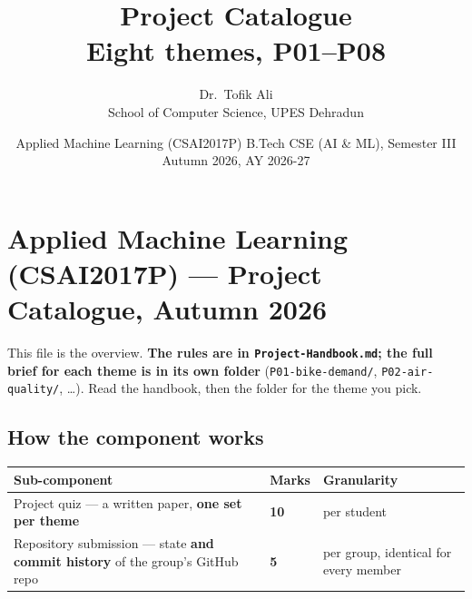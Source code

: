 \documentclass[11pt]{article}
\title{Project Catalogue\\[4pt]\large Eight themes, P01--P08}
\author{Dr.\ Tofik Ali \\ School of Computer Science, UPES Dehradun}
\date{Applied Machine Learning (CSAI2017P) \quad\textbullet\quad B.Tech CSE (AI \& ML), Semester III \\[2pt] Autumn 2026, AY 2026-27}
\begin{document}
\maketitle
\tableofcontents
\newpage

\hypertarget{applied-machine-learning-csai2017p-project-catalogue-autumn-2026}{%
\section{Applied Machine Learning (CSAI2017P) --- Project Catalogue, Autumn 2026}\label{applied-machine-learning-csai2017p-project-catalogue-autumn-2026}}

This file is the overview. \textbf{The rules are in \texttt{Project-Handbook.md}; the full brief for each theme is in its own folder} (\texttt{P01-bike-demand/}, \texttt{P02-air-quality/}, \ldots). Read the handbook, then the folder for the theme you pick.

\hypertarget{how-the-component-works}{%
\subsection{How the component works}\label{how-the-component-works}}

{\footnotesize
\begin{longtable}[]{@{}lll@{}}
\toprule
\begin{minipage}[b]{0.30\columnwidth}\raggedright
Sub-component\strut
\end{minipage} & \begin{minipage}[b]{0.30\columnwidth}\raggedright
Marks\strut
\end{minipage} & \begin{minipage}[b]{0.30\columnwidth}\raggedright
Granularity\strut
\end{minipage}\tabularnewline
\midrule
\endhead
\begin{minipage}[t]{0.30\columnwidth}\raggedright
Project quiz --- a written paper, \textbf{one set per theme}\strut
\end{minipage} & \begin{minipage}[t]{0.30\columnwidth}\raggedright
\textbf{10}\strut
\end{minipage} & \begin{minipage}[t]{0.30\columnwidth}\raggedright
per student\strut
\end{minipage}\tabularnewline
\begin{minipage}[t]{0.30\columnwidth}\raggedright
Repository submission --- state \textbf{and commit history} of the group's GitHub repo\strut
\end{minipage} & \begin{minipage}[t]{0.30\columnwidth}\raggedright
\textbf{5}\strut
\end{minipage} & \begin{minipage}[t]{0.30\columnwidth}\raggedright
per group, identical for every member\strut
\end{minipage}\tabularnewline
\bottomrule
\end{longtable}
}
\end{document}
